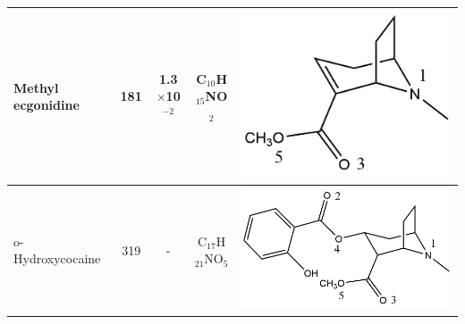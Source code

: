 \begin{table}
\begin{tabular}{lcccc}
Methyl ecgonidine & 181& 1.3$\times$10$^{-2}$ & C$_{10}$H$_{15}$NO$_2$ & \begin{minipage}[c]{0.26\linewidth}\centering \includegraphics[width=0.8\linewidth]{pics/cocaine-chapter/ame_struct.png} \end{minipage}  \\ \midrule
o-Hydroxycocaine & 319 & - &C$_{17}$H$_{21}$NO$_5$ &  \begin{minipage}[c]{0.26\linewidth}\centering \includegraphics[width=\linewidth]{pics/cocaine-chapter/ohcocaine_struct.png} \end{minipage} \\ 
\bottomrule
\end{tabular}
\label{tab:COC_structs}
\end{table}

